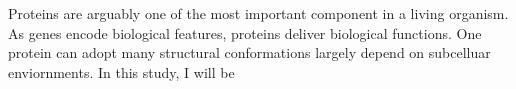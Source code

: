 Proteins are arguably one of the most important component in a living organism. As genes encode biological features, proteins deliver biological functions. One protein can adopt many structural conformations largely depend on  subcelluar enviornments.    In this study, I will be 